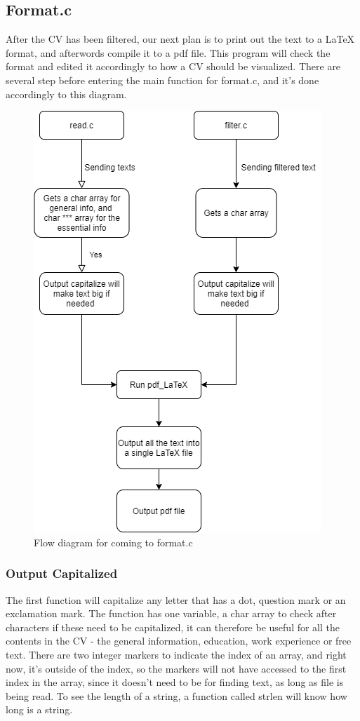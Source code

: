 \subsection{Format.c}
After the CV has been filtered, our next plan is to print out the text to a LaTeX format, and afterwords compile it to a pdf file. 
This program will check the format and edited it accordingly to how a CV should be visualized. 
There are several step before entering the main function for format.c,
and it's done accordingly to this diagram.
\begin{figure}[H]
  \centering
  \includegraphics[scale = 0.6]{figures/Fra_read.c_og_filter.c_format.c}
  \caption{Flow diagram for coming to format.c}
\end{figure}

\subsubsection{Output Capitalized}
The first function will capitalize any letter that has a dot, question mark or an exclamation mark.
The function has one variable, a char array to check after characters if these need to be capitalized,
it can therefore be useful for all the contents in the CV - the general information, education, work experience or free text.
There are two integer markers to indicate the index of an array, 
and right now, it's outside of the index, so the markers will not have accessed to the first index in the array,
since it doesn't need to be for finding text, as long as file is being read.
To see the length of a string, a function called strlen will know how long is a string. \\

